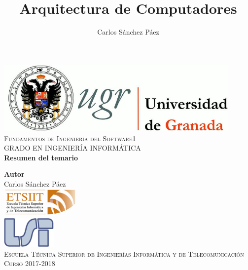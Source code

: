 \documentclass[12pt,spanish]{article}
\title{Arquitectura de Computadores}
\author{Carlos Sánchez Páez}
\begin{document}
\begin{titlepage}

\newlength{\centeroffset}
\setlength{\centeroffset}{-0.5\oddsidemargin}
\addtolength{\centeroffset}{0.5\evensidemargin}
\thispagestyle{empty}

\noindent\hspace*{\centeroffset}
\begin{minipage}{\textwidth}

\centering
\includegraphics[width=0.9\textwidth]{logo_ugr.jpg}\\[1.4cm]

\textsc{ \Large Fundamentos de Ingeniería del Software1\\[0.2cm]}
\textsc{GRADO EN INGENIERÍA INFORMÁTICA}\\[1cm]

{\Huge\bfseries Resumen del temario\\}
\end{minipage}

\vspace{1.5cm}
\noindent\hspace*{\centeroffset}
\begin{minipage}{\textwidth}
\centering

\textbf{Autor}\\ {Carlos Sánchez Páez}\\[2.5ex]
\includegraphics[width=0.3\textwidth]{etsiit_logo.png}\\[0.1cm]
\vspace{1.5cm}
\includegraphics[width=0.2\textwidth]{lsi.png}\\[0.1cm]
\vspace{1cm}
\textsc{Escuela Técnica Superior de Ingenierías Informática y de Telecomunicación}\\
\vspace{1cm}
\textsc{Curso 2017-2018}
\end{minipage}
\end{titlepage}
\thispagestyle{empty}
\newpage
\tableofcontents{}
\newpage
\listoffigures
\thispagestyle{empty}
\newpage
\end{document}
